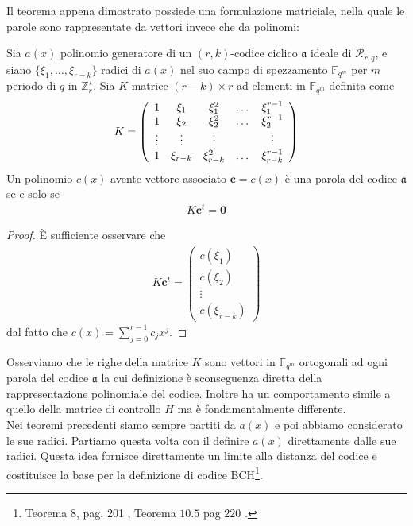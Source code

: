 \noindent
Il teorema appena dimostrato possiede una formulazione matriciale, nella quale le parole sono rappresentate da vettori invece che da polinomi:
\begin{teorema}
   Sia $a(x)$ polinomio generatore di un $(r,k)$-codice ciclico $\mathfrak{a}$ ideale di $\mathcal{R}_{r,q}$, e siano $\lbrace \xi_{1}, \dots,\xi_{r-k} \rbrace $ radici di $a(x)$ nel suo campo di spezzamento $\mathbb{F}_{q^m}$ per $m$ periodo di $q$ in $\mathbb{Z}_{r}^{\star}$.
   Sia $K$ matrice $(r-k)\times r$ ad elementi in $\mathbb{F}_{q^m}$ definita come
   \begin{align*}
        K =
 	\left(
 	\begin{array} {c c c c c}
 	1 & \xi_1 & \xi_{1}^{2} & \dots & \xi_{1}^{r-1}   \\
        1 & \xi_2 & \xi_{2}^{2} & \dots & \xi_{2}^{r-1}   \\
        \vdots & \vdots & \vdots &  & \vdots   \\
        1 & \xi_{r-k}& \xi_{r-k}^{2} & \dots & \xi_{r-k}^{r-1}
 	\end{array}
 	\right)
     \end{align*}
   Un polinomio $c(x)$ avente vettore associato $\mathbf{c} = c(x) $ è una parola del codice $\mathfrak{a}$ se e solo se
   \begin{align*}
      K \mathbf{c}^{t} = \mathbf{0}
   \end{align*}
\end{teorema}
\begin{proof}
   È sufficiente osservare che
   \begin{align*}
        K \mathbf{c}^{t} =
 	\left(
 	\begin{array} {c }
 	c(\xi_1)  \\
        c(\xi_2)   \\
        \vdots  \\
        c(\xi_{r-k})
 	\end{array}
 	\right)
   \end{align*}
   dal fatto che $c(x) = \sum_{j=0}^{r-1} c_{j}x^{j}$.
\end{proof}
\noindent
Osserviamo che le righe della matrice $K$ sono vettori in $\mathbb{F}_{q^m}$ ortogonali ad ogni parola del codice $\mathfrak{a}$ la cui definizione è sconseguenza diretta della rappresentazione polinomiale del codice. Inoltre ha un comportamento simile a quello della matrice di controllo $H$ ma è fondamentalmente differente.\\
Nei teoremi precedenti siamo sempre partiti da $a(x)$ e poi abbiamo considerato le sue radici. Partiamo questa volta con il definire $a(x)$ direttamente dalle sue radici. Questa idea fornisce direttamente un limite alla distanza del codice e costituisce la base per la definizione di codice BCH\footnote{Teorema $8$, pag. 201 \cite{sloane}, Teorema $10.5$ pag $220$ \cite{berardi}.}.
